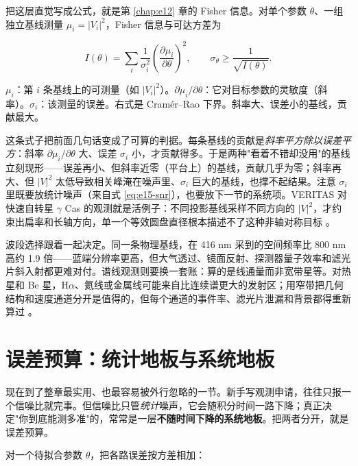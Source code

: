 把这层直觉写成公式，就是第 \ref{chap:e12} 章的 Fisher 信息。对单个参数 \(\theta\)、一组独立基线测量 \(\mu_i=|V_i|^2\)，Fisher 信息与可达方差为

\begin{equation}
  I(\theta)=\sum_i
  \frac{1}{\sigma_i^2}
  \left(\frac{\partial\mu_i}{\partial\theta}\right)^{\!2},
  \qquad
  \sigma_\theta\ge\frac{1}{\sqrt{I(\theta)}} .
  \label{eq:e15-fisher}
\end{equation}
\begin{formulaexplain}
\(\mu_i\)：第 \(i\) 条基线上的可测量（如 \(|V_i|^2\)）。\(\partial\mu_i/\partial\theta\)：它对目标参数的灵敏度（斜率）。\(\sigma_i\)：该测量的误差。右式是 Cramér--Rao 下界。斜率大、误差小的基线，贡献最大。
\end{formulaexplain}

这条式子把前面几句话变成了可算的判据。每条基线的贡献是\emph{斜率平方除以误差平方}：斜率 \(\partial\mu_i/\partial\theta\) 大、误差 \(\sigma_i\) 小，才贡献得多。于是两种"看着不错却没用"的基线立刻现形——误差再小、但斜率近零（平台上）的基线，贡献几乎为零；斜率再大、但 \(|V|^2\) 太低导致相关峰淹在噪声里、\(\sigma_i\) 巨大的基线，也撑不起结果。注意 \(\sigma_i\) 里既要放统计噪声（来自式 \eqref{eq:e15-snr}），也要放下一节的系统项。VERITAS 对快速自转星 \(\gamma\) Cas 的观测就是活例子：不同投影基线采样不同方向的 \(|V|^2\)，才约束出扁率和长轴方向，单一个等效圆盘直径根本描述不了这种非轴对称目标 \citep{2025ApJ...995..191A,2024ApJ...966...28A}。

波段选择跟着一起决定。同一条物理基线，在 416 nm 采到的空间频率比 800 nm 高约 1.9 倍——蓝端分辨率更高，但大气透过、镜面反射、探测器量子效率和滤光片斜入射都更难对付。谱线观测则要换一套账：算的是线通量而非宽带星等。对热星和 Be 星，H\(\alpha\)、氦线或金属线可能来自比连续谱更大的发射区；用窄带把几何结构和速度通道分开是值得的，但每个通道的事件率、滤光片泄漏和背景都得重新算过 \citep{2012NewAR..56..143D,2021MNRAS.506.1585Z}。

\section{误差预算：统计地板与系统地板}
\label{sec:e15-error-budget}

现在到了整章最实用、也最容易被外行忽略的一节。新手写观测申请，往往只报一个信噪比就完事。但信噪比只管\emph{统计}噪声，它会随积分时间一路下降；真正决定"你到底能测多准"的，常常是一层\textbf{不随时间下降的系统地板}。把两者分开，就是误差预算。

对一个待拟合参数 \(\theta\)，把各路误差按方差相加：

